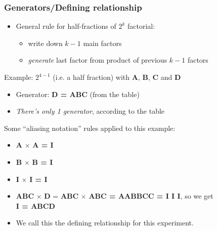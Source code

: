 \begin{frame}\frametitle{Generators/Defining relationship}
	\begin{itemize}
		\item	General rule for half-fractions of $2^k$ factorial:
		\begin{itemize}
			\item	write down $k-1$ main factors
			\item	\emph{generate} last factor from product of previous $k-1$ factors
		\end{itemize}
	\end{itemize}

	Example: $2^{4-1}$ (i.e. a half fraction) with \textbf{A}, \textbf{B}, \textbf{C} and \textbf{D}
	\begin{itemize}
		\item	Generator: \textbf{D = ABC} (from the table)
		\item	\emph{There's only 1 generator}, according to the table
	\end{itemize}

	\vspace{12pt}
	Some ``aliasing notation'' rules applied to this example:
	\begin{itemize}
		\item	\textbf{A} $\times$ \textbf{A = I}
		\item	\textbf{B} $\times$ \textbf{B = I}
		\item	\textbf{I} $\times$ \textbf{I = I}
		\item	\textbf{ABC} $\times$ \textbf{D} = \textbf{ABC} $\times$ \textbf{ABC = AABBCC = I I I}, so we get\\ \textbf{I = ABCD}
		\item	We call this the defining relationship for this experiment.
	\end{itemize}
\end{frame}

